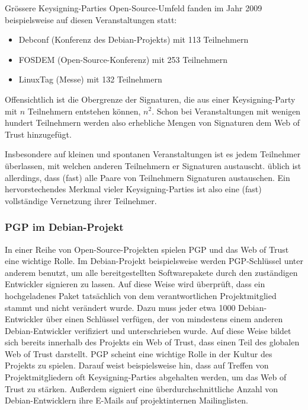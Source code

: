 Grössere Keysigning-Parties Open-Source-Umfeld fanden im Jahr 2009
beispielsweise auf diesen Veranstaltungen statt:
\begin{itemize}
\item Debconf (Konferenz des Debian-Projekts) mit 113 Teilnehmern
\item FOSDEM (Open-Source-Konferenz) mit 253 Teilnehmern
\item LinuxTag (Messe) mit 132 Teilnehmern
\end{itemize}

Offensichtlich ist die Obergrenze der Signaturen, die aus einer
Keysigning-Party mit $n$ Teilnehmern entstehen können, $n^2$. Schon
bei Veranstaltungen mit wenigen hundert Teilnehmern werden also
erhebliche Mengen von Signaturen dem Web of Trust hinzugefügt.

Insbesondere auf kleinen und spontanen Veranstaltungen ist es jedem
Teilnehmer überlassen, mit welchen anderen Teilnehmern er Signaturen
austauscht. üblich ist allerdings, dass (fast) alle Paare von
Teilnehmern Signaturen austauschen. Ein hervorstechendes Merkmal
vieler Keysigning-Parties ist also eine (fast) vollständige
Vernetzung ihrer Teilnehmer.

\subsubsection{PGP im Debian-Projekt}
\label{sec:foobar-fixme}

In einer Reihe von Open-Source-Projekten spielen PGP und das Web of
Trust eine wichtige Rolle. Im Debian-Projekt beispielsweise werden
PGP-Schlüssel unter anderem benutzt, um alle bereitgestellten
Softwarepakete durch den zuständigen Entwickler signieren zu
lassen. Auf diese Weise wird überprüft, dass ein hochgeladenes
Paket tatsächlich von dem verantwortlichen Projektmitglied stammt
und nicht verändert wurde. Dazu muss jeder etwa 1000
Debian-Entwickler über einen Schlüssel verfügen, der von
mindestens einem anderen Debian-Entwickler verifiziert und
unterschrieben wurde. Auf diese Weise bildet sich bereits innerhalb
des Projekts ein Web of Trust, dass einen Teil des globalen Web of
Trust darstellt. PGP scheint eine wichtige Rolle in der Kultur des
Projekts zu spielen. Darauf weist beispielsweise hin, dass auf Treffen
von Projektmitgliedern oft Keysigning-Parties abgehalten werden, um
das Web of Trust zu stärken. Außerdem signiert eine
überdurchschnittliche Anzahl von Debian-Entwicklern ihre E-Mails auf
projektinternen Mailinglisten.

